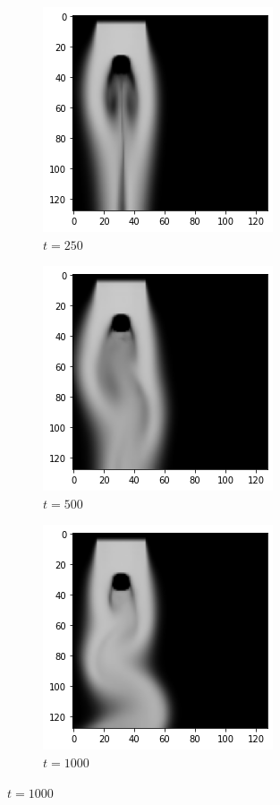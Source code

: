 \documentclass[a4paper,12pt,twoside]{report}
\begin{document}
\begin{figure}
	\centering
	\begin{subfigure}{0.18\textwidth}
		\centering
		\includegraphics[scale=0.3]{timecost/low250.png}
		\caption{$t=250$}
	\end{subfigure}
	\begin{subfigure}{0.18\textwidth}
		\centering
		\includegraphics[scale=0.3]{timecost/low500.png}
		\caption{$t=500$}
	\end{subfigure}
	\begin{subfigure}{0.18\textwidth}
		\centering
		\includegraphics[scale=0.3]{timecost/low1000.png}
		\caption{$t=1000$}

\end{subfigure}
\end{figure}
\end{document}
